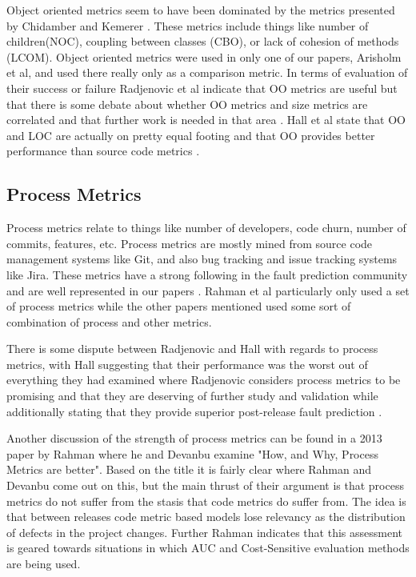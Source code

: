 \documentclass{sig-alternate-05-2015}
\begin{document}
Object oriented metrics seem to have been dominated by the metrics presented by Chidamber and Kemerer \cite{Chidamber} \cite{DAmbros}.  These metrics include things like number of children(NOC), coupling between classes (CBO), or lack of cohesion of methods (LCOM).  Object oriented metrics were used in only one of our papers, Arisholm et al, and used there really only as a comparison metric\cite{Arisholm}.  In terms of evaluation of their success or failure Radjenovic et al indicate that OO metrics are useful but that there is some debate about whether OO metrics and size metrics are correlated and that further work is needed in that area  \cite{Radjenovic}.  Hall et al state that OO and LOC are actually on pretty equal footing and that OO provides better performance than source code metrics \cite{Hall}.

\subsection{Process Metrics}

Process metrics relate to things like number of developers, code churn, number of commits, features, etc.  Process metrics are mostly mined from source code management systems like Git, and also bug tracking and issue tracking systems like Jira.   These metrics have a strong following in the fault prediction community and are well represented in our papers \cite{Posnett} \cite{Bird} \cite{Arisholm} \cite{Rahman}.  Rahman et al particularly only used a set of process metrics while the other papers mentioned used some sort of combination of process and other metrics.  

There is some dispute between Radjenovic and Hall with regards to process metrics, with Hall suggesting that their performance was the worst out of everything they had examined where Radjenovic considers process metrics to be promising and that they are deserving of further study and validation while additionally stating that they provide superior post-release fault prediction \cite{Hall} \cite{Radjenovic}.  

Another discussion of the strength of process metrics can be found in a 2013 paper by Rahman where he and Devanbu examine "How, and Why, Process Metrics are better"\cite{Rahman13}.  Based on the title it is fairly clear where Rahman and Devanbu come out on this, but the main thrust of their argument is that process metrics do not suffer from the stasis that code metrics do suffer from.  The idea is that between releases code metric based models lose relevancy as the distribution of defects in the project changes.  Further Rahman indicates that this assessment is geared towards situations in which AUC and Cost-Sensitive evaluation methods are being used. 
\end{document}
